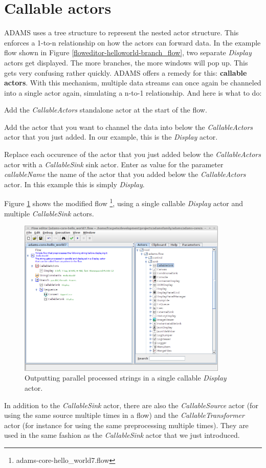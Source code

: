 \section{Callable actors}
\label{callable_actors}
ADAMS uses a tree structure to represent the nested actor structure. This
enforces a 1-to-n relationship on how the actors can forward data. In the
example flow shown in Figure \ref{floweditor-helloworld-branch_flow}, two
separate \textit{Display} actors get displayed. The more branches, the more
windows will pop up. This gets very confusing rather quickly. ADAMS offers a
remedy for this: \textbf{callable actors}. With this mechanism, multiple data
streams can once again be channeled into a single actor again, simulating a
n-to-1 relationship. And here is what to do:
\begin{tight_itemize}
	\item Add the \textit{CallableActors} standalone actor at the start of the flow.
	\item Add the actor that you want to channel the data into below the
	\textit{CallableActors} actor that you just added. In our example, this is the
	\textit{Display} actor.
	\item Replace each occurence of the actor that you just added below the
	\textit{CallableActors} actor with a \textit{CallableSink} sink actor. Enter as
	value for the parameter \textit{callableName} the name of the actor that you
	added below the \textit{CallableActors} actor. In this example this is simply
	\textit{Display}.
\end{tight_itemize}
Figure \ref{floweditor-helloworld-callable_display} shows the modified flow
\footnote{adams-core-hello\_world7.flow}, using a single callable \textit{Display}
actor and multiple \textit{CallableSink} actors.
\begin{figure}[htb]
  \centering
  \includegraphics[width=10.0cm]{images/floweditor-helloworld-callable_display.png}
  \caption{Outputting parallel processed strings in a single callable
  \textit{Display} actor.}
  \label{floweditor-helloworld-callable_display}
\end{figure}
In addition to the \textit{CallableSink} actor, there are also the
\textit{CallableSource} actor (for using the same source multiple times in a flow)
and the \textit{CallableTransformer} actor (for instance for using the same
preprocessing multiple times). They are used in the same fashion as the
\textit{CallableSink} actor that we just introduced.

